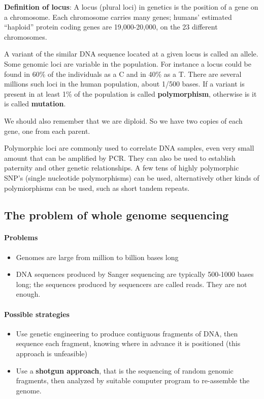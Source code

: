 \textbf{Definition of locus}: A locus (plural loci) in genetics is the position
of a gene on a chromosome.
Each chromosome carries many genes; humans' estimated ``haploid'' protein
coding genes are 19,000-20,000, on the 23 different chromosomes.

A variant of the similar DNA sequence located at a given locus is called
an allele. \\

Some genomic loci are variable in the population.
For instance a locus could be found in 60\% of the individuals as a C and
in 40\% as a T.
There are several millions such loci in the human population, about 1/500
bases.
If a variant is present in at least 1\% of the population is called
\textbf{polymorphism}, otherwise is it is called \textbf{mutation}. 

We should also remember that we are diploid.
So we have two copies of each gene, one from each parent.

Polymorphic loci are commonly used to correlate DNA samples,
even very small amount that can be amplified by PCR.
They can also be used to establish paternity and other genetic
relationships.
A few tens of highly polymorphic SNP's (single nucleotide polymorphisms)
can be used, alternatively other kinds of polymiorphisms can be used,
such as short tandem repeats.

\subsection{The problem of whole genome sequencing}

\paragraph*{Problems}
\begin{itemize}
	\item Genomes are large from million to billion bases long
	\item DNA sequences produced by Sanger sequencing are typically 500-1000
bases long; the sequences produced by sequencers are called reads.
They are not enough.
\end{itemize}

\paragraph*{Possible strategies}
\begin{itemize}
	\item Use genetic engineering to produce contiguous fragments of DNA,
then sequence each fragment, knowing where in advance it is positioned
(this approach is unfeasible)
	\item Use a \textbf{shotgun approach}, that is the sequencing of random
genomic fragments, then analyzed by suitable computer program to re-assemble
the genome.
\end{itemize}

